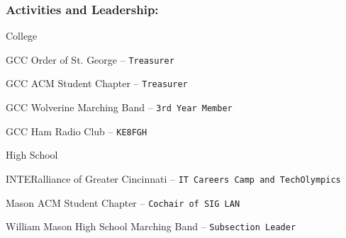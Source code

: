\documentclass[12pt]{article}
\begin{document}
\subsubsection*{\color{head}Activities and Leadership:}
College
\begin{compactitem}
	\item {\color{accent} GCC Order of St. George} -- \texttt{Treasurer}
	\item {\color{accent} GCC ACM Student Chapter} -- \texttt{Treasurer}
	\item {\color{accent} GCC Wolverine Marching Band} -- \texttt{3rd Year Member}
	\item {\color{accent} GCC Ham Radio Club} -- \texttt{KE8FGH}
\end{compactitem}
High School
\begin{compactitem}
	\item {\color{accent} INTERalliance of Greater Cincinnati} -- \texttt{IT Careers Camp and TechOlympics}
	\item {\color{accent} Mason ACM Student Chapter} -- \texttt{Cochair of SIG LAN}
	\item {\color{accent} William Mason High School Marching Band} -- \texttt{Subsection Leader}
\end{compactitem}
\end{document}
